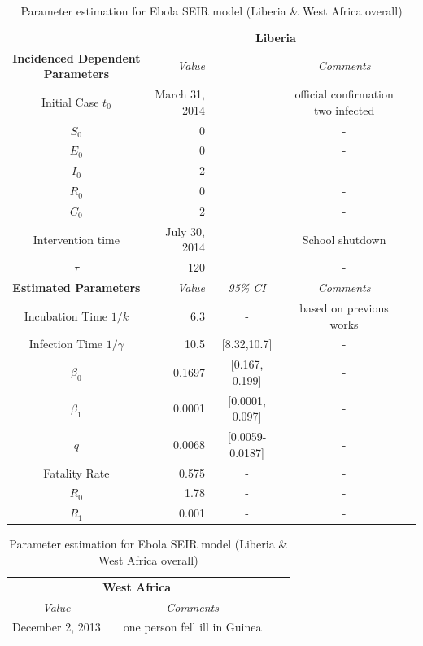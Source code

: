 \documentclass[10pt, journal,onecolumn]{IEEEtran}
\newcommand{\ra}[1]{\renewcommand{\arraystretch}{#1}}
\begin{document}
\begin{appendix}
\begin{table}[h]
\caption{Parameter estimation for Ebola SEIR model (Liberia \& West Africa overall)} 
\centering
\tiny
\parbox{.55\linewidth}{\centering
\ra{1.3}
\begin{tabular}{@{}crccc@{}}%
& \multicolumn{3}{c}{\textbf{Liberia}} &  \\
\cmidrule{2-4}
\textbf{Incidenced Dependent Parameters} & \textit{Value} && \textit{Comments} \\
\midrule
Initial Case $t_0$ & March 31, 2014 &  & official confirmation two infected \cite{}\\
$S_0$ & 0& & -\\
$E_0$ & 0& & -\\
$I_0$ & 2& & -\\
$R_0$ & 0& & -\\
$C_0$ & 2& &-\\
Intervention time & July 30, 2014 &  & School shutdown\\
$\tau$ &120 & & -\\
\midrule
\textbf{Estimated Parameters} & \textit{Value} & \textit{95\% CI} & \textit{Comments} \\
\midrule
Incubation Time $1/k$ &6.3 & - & based on previous works \cite{}\\
Infection Time $1/\gamma$ &10.5 & [8.32,10.7] & -\\
$\beta_0$ &0.1697 & [0.167, 0.199] & -\\
$\beta_1$ &0.0001 & [0.0001, 0.097] & -\\
$q$ &0.0068 & [0.0059-0.0187] & -\\
Fatality Rate &0.575 & - & -\\
$R_0$ &1.78 &- &-\\
$R_1$ &0.001 & - &-\\
\end{tabular}
}
\parbox{.3\linewidth}{\centering
\ra{1.3}
\begin{tabular}{@{}crccc@{}}%
\multicolumn{3}{c}{\textbf{West Africa}} &  \\
\cmidrule{1-3}
 \textit{Value} && \textit{Comments} \\
\midrule
December 2, 2013 &  & one person fell ill in Guinea\\

\end{tabular}}
\end{table}
\end{appendix}
\end{document}
